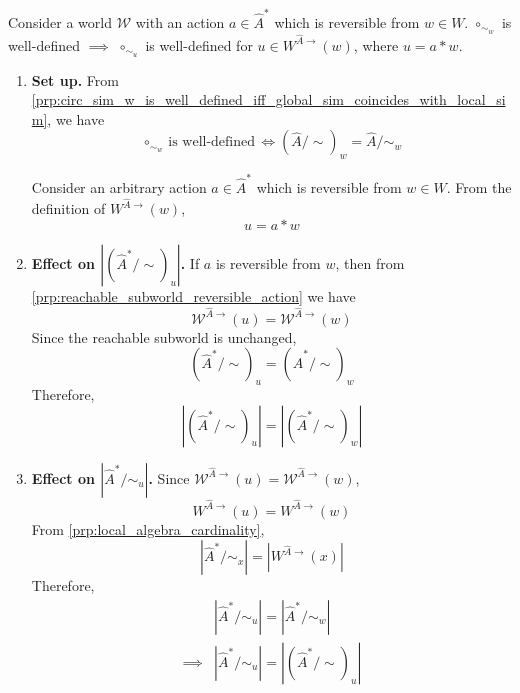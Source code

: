 \begin{propositionE}[][normal]
    Consider a world $\mathscr{W}$ with an action $a \in \hat{A}^{*}$ which is reversible from $w \in W$.
    $\circ_{\sim_{w}}$ is well-defined $\implies$ $\circ_{\sim_{u}}$ is well-defined for $u \in W^{\hat{A}\to}(w)$, where $u = a \ast w$.
\end{propositionE}
\begin{proofE}
\begin{enumerate}[(1)]
    \item \textbf{Set up.}
    From \cref{prp:circ_sim_w_is_well_defined_iff_global_sim_coincides_with_local_sim}, we have
    \begin{equation}
        \text{$\circ_{\sim_{w}}$ is well-defined} \iff (\hat{A}/\sim)_{w} = \hat{A}/\sim_{w}
    \end{equation}

    Consider an arbitrary action $a \in \hat{A}^{*}$ which is reversible from $w \in W$.
    From the definition of $W^{\hat{A}\to}(w)$,
    \begin{equation}
        u = a \ast w
    \end{equation}

    \item \textbf{Effect on $|(\hat{A}^{*}/\sim)_{u}|$.}
    If $a$ is reversible from $w$, then from \cref{prp:reachable_subworld_reversible_action} we have
    \begin{equation}
        \mathscr{W}^{\hat{A}\to}(u) = \mathscr{W}^{\hat{A}\to}(w)
    \end{equation}
    Since the reachable subworld is unchanged, 
    \begin{equation}
        (\hat{A}^{*}/\sim)_{u} = (\hat{A}^{*}/\sim)_{w}
    \end{equation}
    Therefore,
    \begin{equation}
        |(\hat{A}^{*}/\sim)_{u}| = |(\hat{A}^{*}/\sim)_{w}|
    \end{equation}
    
    \item \textbf{Effect on $|\hat{A}^{*}/\sim_{u}|$.}
    Since $\mathscr{W}^{\hat{A}\to}(u) = \mathscr{W}^{\hat{A}\to}(w)$,
    \begin{equation}
        W^{\hat{A}\to}(u) = W^{\hat{A}\to}(w)
    \end{equation}
    From \cref{prp:local_algebra_cardinality},
    \begin{equation}
        |\hat{A}^{*}/\sim_{x}| = |W^{\hat{A}\to}(x)|
    \end{equation}
    Therefore,
    \begin{align}
        & |\hat{A}^{*}/\sim_{u}| = |\hat{A}^{*}/\sim_{w}| \\
        \implies & |\hat{A}^{*}/\sim_{u}| = |(\hat{A}^{*}/\sim)_{u}|
    \end{align}


\end{enumerate}
\end{proofE}
